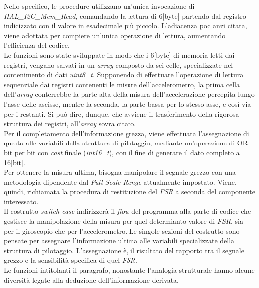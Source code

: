 \documentclass[11pt]{report}
\begin{document}
Nello specifico, le procedure utilizzano un'unica invocazione di \textit{HAL\_I2C\_Mem\_Read}, comandando la lettura di 6[byte] partendo dal registro indicizzato con il valore in esadecimale più piccolo. L'adiacenza poc anzi citata, viene adottata per compiere un'unica operazione di lettura, aumentando l'efficienza del codice.\\
Le funzioni sono state sviluppate in modo che i 6[byte] di memoria letti dai registri, vengano salvati in un \textit{array} composto da sei celle, specializzate nel contenimento di dati \textit{uint8\_t}.
Supponendo di effettuare l'operazione di lettura sequenziale dai registri contenenti le misure dell'accelerometro, la prima cella dell'\textit{array} conterrebbe la parte alta della misura dell'accelerazione percepita lungo l'asse delle ascisse, mentre la seconda, la parte bassa per lo stesso asse, e così via per i restanti.
Si può dire, dunque, che avviene il trasferimento della rigorosa struttura dei registri, all'\textit{array} sovra citato.\\
Per il completamento dell'informazione grezza, viene effettuata l'assegnazione di questa alle variabili della struttura di pilotaggio, mediante un'operazione di OR bit per bit con \textit{cast} finale (\textit{int16\_t}), con il fine di generare il dato completo a 16[bit].\\
Per ottenere la misura ultima, bisogna manipolare il segnale grezzo con una metodologia dipendente dal \textit{Full Scale Range} attualmente impostato. Viene, quindi, richiamata la procedura di restituzione del \textit{FSR} a seconda del componente interessato.\\
Il costrutto \textit{switch-case} indirizzerà il \textit{flow} del programma alla parte di codice che gestisce la manipolazione della misura per quel determianto valore di \textit{FSR}, sia per il giroscopio che per l'accelerometro. Le singole sezioni del costrutto sono pensate per assegnare l'informazione ultima alle variabili specializzate della struttura di pilotaggio.
L'assegnazione è, il risultato del rapporto tra il segnale grezzo e la sensibilità specifica di quel \textit{FSR}.\\
Le funzioni intitolanti il paragrafo, nonostante l'analogia strutturale hanno alcune diversità legate alla deduzione dell'informazione derivata.
\end{document}
